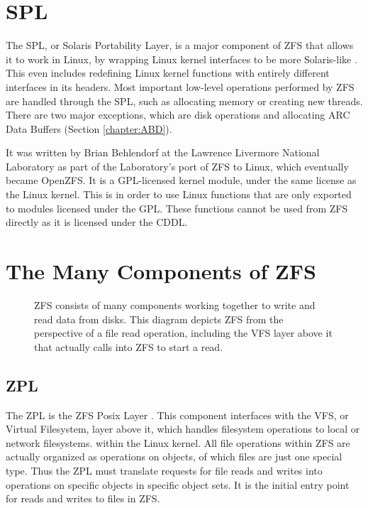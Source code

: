 \section{SPL}
The SPL, or Solaris Portability Layer, is a major component of ZFS that allows it to work in Linux, 
by wrapping Linux kernel interfaces to be more Solaris-like \cite{zfs}.
This even includes redefining Linux kernel functions with entirely different interfaces in its headers.
Most important low-level operations performed by ZFS are handled through the SPL, such as allocating memory or creating new threads.
There are two major exceptions, which are disk operations and allocating ARC Data Buffers (Section \ref{chapter:ABD}).

It was written by Brian Behlendorf at the Lawrence Livermore National Laboratory as part of the Laboratory's port of ZFS to Linux,
which eventually became OpenZFS.
It is a GPL-licensed kernel module, under the same license as the Linux kernel. 
This is in order to use Linux functions that are only exported to modules licensed under the GPL.
These functions cannot be used from ZFS directly as it is licensed under the CDDL.

\section{The Many Components of ZFS}

\begin{figure}[H]
    \centering
    \resizebox{!}{0.35\textheight}{}
    \caption{ZFS consists of many components working together to write and read data from disks.
    This diagram depicts ZFS from the perspective of a file read operation,
    including the VFS layer above it that actually calls into ZFS to start a read.}
    \label{fig:ZFSOrganization}
\end{figure}

\subsection{ZPL}
The ZPL is the ZFS Posix Layer \cite{dawidek_closer_2008}. 
This component interfaces with the VFS, or Virtual Filesystem, layer above it, which handles filesystem operations to local or network
filesystems.
within the Linux kernel.
All file operations within ZFS are actually organized as operations on objects, of which files are just one special type.
Thus the ZPL must translate requests for file reads and writes into operations on specific objects in specific object sets.
It is the initial entry point for reads and writes to files in ZFS.

